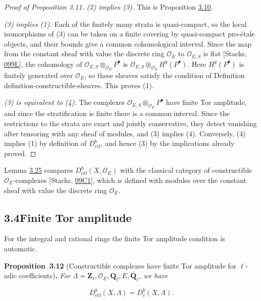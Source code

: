 \documentclass[11pt]{article}
\newenvironment{bpstatement}[2]{\par\addvspace{0.6\baselineskip}\noindent\textbf{#1}#2\textbf{.}\enspace\ignorespaces}
  {\par\addvspace{0.4\baselineskip}}
\newenvironment{bpstatementit}[2]{\begin{bpstatement}{#1}{#2}\itshape\ignorespaces}{\end{bpstatement}}
\providecommand{\Dbc}{}\renewcommand{\Dbc}{D^b_c}
\begin{document}
\begin{proof}[{Proof of Proposition 3.11}]
\emph{(2) implies (3).} This is Proposition \hyperref[bp31]{3.10}.

\emph{(3) implies (1).} Each of the finitely many strata is quasi-compact, so the local isomorphisms of (3) can be taken on a finite covering by quasi-compact pro-étale objects, and their bounds give a common cohomological interval. Since the map from the constant sheaf with value the discrete ring \(\mathcal O_E\) to \(\mathcal O_{E,S}\) is flat [Stacks, \href{https://stacks.math.columbia.edu/tag/099L}{099L}], the cohomology of \(\mathcal O_{E,S}\otimes_{\mathcal O_E}P^\bullet\) is \(\mathcal O_{E,S}\otimes_{\mathcal O_E}H^q(P^\bullet)\). Here \(H^q(P^\bullet)\) is finitely generated over \(\mathcal O_E\), so these sheaves satisfy the condition of Definition definition-constructible-sheaves. This proves (1).

\emph{(3) is equivalent to (4).} The complexes \(\mathcal O_{E,S}\otimes_{\mathcal O_E}P^\bullet\) have finite Tor amplitude, and since the stratification is finite there is a common interval. Since the restrictions to the strata are exact and jointly conservative, they detect vanishing after tensoring with any sheaf of modules, and (3) implies (4). Conversely, (4) implies (1) by definition of \(D^b_{\mathrm{ctf}}\), and hence (3) by the implications already proved.
\end{proof}

\label{bp37}%
Lemma \hyperref[bp82]{3.25} compares \(D^b_{\mathrm{ctf}}(X,\mathcal O_E)\) with the classical category of constructible \(\mathcal O_E\)-complexes [Stacks, \href{https://stacks.math.columbia.edu/tag/09C1}{09C1}], which is defined with modules over the constant sheaf with value the discrete ring \(\mathcal O_E\).


\subsection*{\texorpdfstring{3.4\quad Finite Tor amplitude}{3.4 Finite Tor amplitude}}
\label{bp38}%
\label{bp39}%
For the integral and rational rings the finite Tor amplitude condition is automatic.

\label{bp40}%
\begin{bpstatementit}{Proposition~3.12}{ (Constructible complexes have finite Tor amplitude for $\ell$-adic coefficients)}
For \(\Lambda=\mathbf Z_\ell,\mathcal O_E,\mathbf Q_\ell,E,\overline{\mathbf Q}_\ell\), we have

\[
D^b_{\mathrm{ctf}}(X,\Lambda)=\Dbc(X,\Lambda).
\]
\end{bpstatementit}
\end{document}
